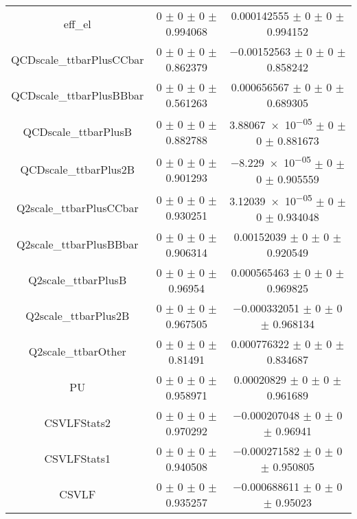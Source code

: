\begin{table}
\begin{tabular}{ccc}
eff\_el 	& \num{0} $\pm$ \num{0} $\pm$ \num{0} $\pm$ \num{0.994068} 	& \num{0.000142555} $\pm$ \num{0} $\pm$ \num{0} $\pm$ \num{0.994152}\\
QCDscale\_ttbarPlusCCbar 	& \num{0} $\pm$ \num{0} $\pm$ \num{0} $\pm$ \num{0.862379} 	& \num{-0.00152563} $\pm$ \num{0} $\pm$ \num{0} $\pm$ \num{0.858242}\\
QCDscale\_ttbarPlusBBbar 	& \num{0} $\pm$ \num{0} $\pm$ \num{0} $\pm$ \num{0.561263} 	& \num{0.000656567} $\pm$ \num{0} $\pm$ \num{0} $\pm$ \num{0.689305}\\
QCDscale\_ttbarPlusB 	& \num{0} $\pm$ \num{0} $\pm$ \num{0} $\pm$ \num{0.882788} 	& \num{3.88067e-05} $\pm$ \num{0} $\pm$ \num{0} $\pm$ \num{0.881673}\\
QCDscale\_ttbarPlus2B 	& \num{0} $\pm$ \num{0} $\pm$ \num{0} $\pm$ \num{0.901293} 	& \num{-8.229e-05} $\pm$ \num{0} $\pm$ \num{0} $\pm$ \num{0.905559}\\
Q2scale\_ttbarPlusCCbar 	& \num{0} $\pm$ \num{0} $\pm$ \num{0} $\pm$ \num{0.930251} 	& \num{3.12039e-05} $\pm$ \num{0} $\pm$ \num{0} $\pm$ \num{0.934048}\\
Q2scale\_ttbarPlusBBbar 	& \num{0} $\pm$ \num{0} $\pm$ \num{0} $\pm$ \num{0.906314} 	& \num{0.00152039} $\pm$ \num{0} $\pm$ \num{0} $\pm$ \num{0.920549}\\
Q2scale\_ttbarPlusB 	& \num{0} $\pm$ \num{0} $\pm$ \num{0} $\pm$ \num{0.96954} 	& \num{0.000565463} $\pm$ \num{0} $\pm$ \num{0} $\pm$ \num{0.969825}\\
Q2scale\_ttbarPlus2B 	& \num{0} $\pm$ \num{0} $\pm$ \num{0} $\pm$ \num{0.967505} 	& \num{-0.000332051} $\pm$ \num{0} $\pm$ \num{0} $\pm$ \num{0.968134}\\
Q2scale\_ttbarOther 	& \num{0} $\pm$ \num{0} $\pm$ \num{0} $\pm$ \num{0.81491} 	& \num{0.000776322} $\pm$ \num{0} $\pm$ \num{0} $\pm$ \num{0.834687}\\
PU 	& \num{0} $\pm$ \num{0} $\pm$ \num{0} $\pm$ \num{0.958971} 	& \num{0.00020829} $\pm$ \num{0} $\pm$ \num{0} $\pm$ \num{0.961689}\\
CSVLFStats2 	& \num{0} $\pm$ \num{0} $\pm$ \num{0} $\pm$ \num{0.970292} 	& \num{-0.000207048} $\pm$ \num{0} $\pm$ \num{0} $\pm$ \num{0.96941}\\
CSVLFStats1 	& \num{0} $\pm$ \num{0} $\pm$ \num{0} $\pm$ \num{0.940508} 	& \num{-0.000271582} $\pm$ \num{0} $\pm$ \num{0} $\pm$ \num{0.950805}\\
CSVLF 	& \num{0} $\pm$ \num{0} $\pm$ \num{0} $\pm$ \num{0.935257} 	& \num{-0.000688611} $\pm$ \num{0} $\pm$ \num{0} $\pm$ \num{0.95023}\\

\end{tabular}
\end{table}
